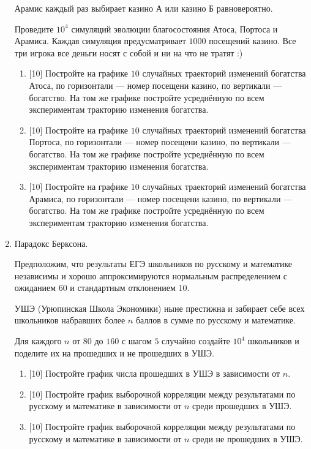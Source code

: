 \documentclass[12pt]{article}
\begin{document}
\begin{enumerate}
Арамис каждый раз выбирает казино А или казино Б равновероятно. 

Проведите $10^4$ симуляций эволюции благосостояния Атоса, Портоса и Арамиса.
Каждая симуляция предусматривает $1000$ посещений казино. 
Все три игрока все деньги носят с собой и ни на что не тратят :)

\begin{enumerate}
    \item {[10]} Постройте на графике $10$ случайных траекторий изменений богатства Атоса, по горизонтали — 
    номер посещени казино, по вертикали — богатство. 
    На том же графике постройте усреднённую по всем экспериментам тракторию изменения богатства.
    \item {[10]} Постройте на графике $10$ случайных траекторий изменений богатства Портоса, по горизонтали — 
    номер посещени казино, по вертикали — богатство. 
    На том же графике постройте усреднённую по всем экспериментам тракторию изменения богатства.
    \item {[10]} Постройте на графике $10$ случайных траекторий изменений богатства Арамиса, по горизонтали — 
    номер посещени казино, по вертикали — богатство. 
    На том же графике постройте усреднённую по всем экспериментам тракторию изменения богатства.
\end{enumerate}


\item Парадокс Берксона. 

Предположим, что результаты ЕГЭ школьников по русскому и математике независимы и хорошо аппроксимируются 
нормальным распределением с ожиданием 60 и стандартным отклонением 10. 

УШЭ (Урюпинская Школа Экономики) ныне престижна и забирает себе всех школьников набравших более $n$ баллов в сумме по русскому и математике. 

Для каждого $n$ от $80$ до $160$ с шагом $5$ случайно создайте $10^4$ школьников и поделите их на прошедших и не прошедших в УШЭ.

\begin{enumerate}
    \item {[10]} Постройте график числа прошедших в УШЭ в зависимости от $n$. 
    \item {[10]} Постройте график выборочной корреляции между результатами по русскому и математике в зависимости от $n$ 
    среди прошедших в УШЭ.
    \item {[10]} Постройте график выборочной корреляции между результатами по русскому и математике в зависимости от $n$ 
    среди не прошедших в УШЭ.
\end{enumerate}


\end{enumerate}
\end{document}
